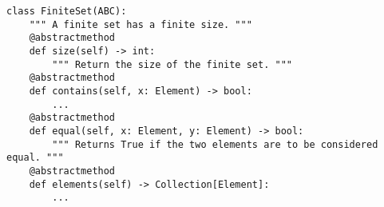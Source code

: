 \par\begin{minipage}{76ex}
\begin{verbatim}
class FiniteSet(ABC):
    """ A finite set has a finite size. """
    @abstractmethod
    def size(self) -> int:
        """ Return the size of the finite set. """
    @abstractmethod
    def contains(self, x: Element) -> bool:
        ...
    @abstractmethod
    def equal(self, x: Element, y: Element) -> bool:
        """ Returns True if the two elements are to be considered equal. """
    @abstractmethod
    def elements(self) -> Collection[Element]:
        ...
\end{verbatim}
\end{minipage}\par